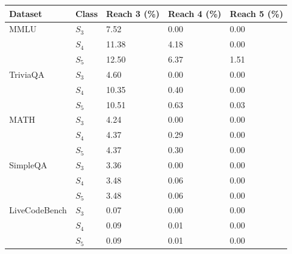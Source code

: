 \begin{tabular}{lllll}
\toprule
Dataset & Class & Reach 3 (\%) & Reach 4 (\%) & Reach 5 (\%) \\
\midrule
MMLU & $S_3$ & 7.52 & 0.00 & 0.00 \\
 & $S_4$ & 11.38 & 4.18 & 0.00 \\
 & $S_5$ & 12.50 & 6.37 & 1.51 \\
TriviaQA & $S_3$ & 4.60 & 0.00 & 0.00 \\
 & $S_4$ & 10.35 & 0.40 & 0.00 \\
 & $S_5$ & 10.51 & 0.63 & 0.03 \\
MATH & $S_3$ & 4.24 & 0.00 & 0.00 \\
 & $S_4$ & 4.37 & 0.29 & 0.00 \\
 & $S_5$ & 4.37 & 0.30 & 0.00 \\
SimpleQA & $S_3$ & 3.36 & 0.00 & 0.00 \\
 & $S_4$ & 3.48 & 0.06 & 0.00 \\
 & $S_5$ & 3.48 & 0.06 & 0.00 \\
LiveCodeBench & $S_3$ & 0.07 & 0.00 & 0.00 \\
 & $S_4$ & 0.09 & 0.01 & 0.00 \\
 & $S_5$ & 0.09 & 0.01 & 0.00 \\
\bottomrule
\end{tabular}
